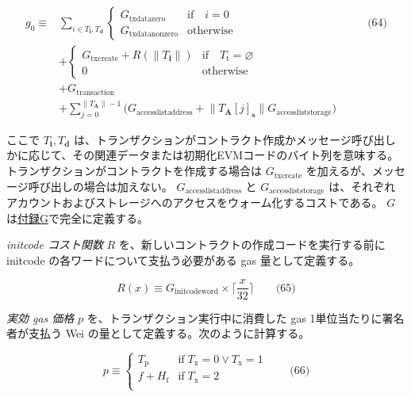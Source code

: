 \documentclass[
]{ltjsarticle}
\begin{document}
\protect\hypertarget{eq-64}{}{}

\[\begin{aligned}
g_0 \equiv {} & \sum_{i \in T_{\mathbf{i}}, T_{\mathbf{d}}} \begin{cases} G_{\mathrm{txdatazero}} & \text{if} \quad i = 0 \\ G_{\mathrm{txdatanonzero}} & \text{otherwise} \end{cases} & \qquad \text{(64)} \\
{} & + \begin{cases} G_{\mathrm{txcreate}} + R({\lVert T_{\mathbf{i}} \rVert}) & \text{if} \quad T_{\mathrm{t}} = \varnothing \\ 0 & \text{otherwise} \end{cases} \\
{} & + G_{\mathrm{transaction}} \\
{} & + \sum_{j = 0}^{\lVert T_{\mathbf{A}} \rVert - 1} \big( G_{\mathrm{accesslistaddress}} + \lVert T_{\mathbf{A}}[j]_{\mathbf{s}} \rVert G_{\mathrm{accessliststorage}} \big)
\end{aligned}\]

ここで \(T_{\mathbf{i}},T_{\mathbf{d}}\)
は、トランザクションがコントラクト作成かメッセージ呼び出しかに応じて、その関連データまたは初期化EVMコードのバイト列を意味する。トランザクションがコントラクトを作成する場合は
\(G_{\mathrm{txcreate}}\)
を加えるが、メッセージ呼び出しの場合は加えない。
\(G_{\mathrm{accesslistaddress}}\) と \(G_{\mathrm{accessliststorage}}\)
は、それぞれアカウントおよびストレージへのアクセスをウォーム化するコストである。
\(G\) は\protect\hyperlink{app:fees}{付録G}で完全に定義する。

\hypertarget{initcode_cost}{}

\emph{initcode コスト関数} \(R\)
を、新しいコントラクトの作成コードを実行する前に initcode
の各ワードについて支払う必要がある gas 量として定義する。

\protect\hypertarget{eq-65}{}{}

\[R(x) \equiv G_{\mathrm{initcodeword}} \times \lceil \frac{x}{32} \rceil \qquad \text{(65)}\]

\hypertarget{effective_gas_price_p}{}

\emph{実効 gas 価格} \(p\) を、トランザクション実行中に消費した gas
1単位当たりに署名者が支払う Wei の量として定義する。次のように計算する。

\protect\hypertarget{eq-66}{}{}

\[p \equiv \begin{cases}
  T_{\mathrm{p}} & \text{if} \; T_{\mathrm{x}} = 0 \lor T_{\mathrm{x}} = 1 \\
  f + H_{\mathrm{f}} & \text{if} \; T_{\mathrm{x}} = 2 \\
  \end{cases} \qquad \text{(66)}\]
\end{document}
